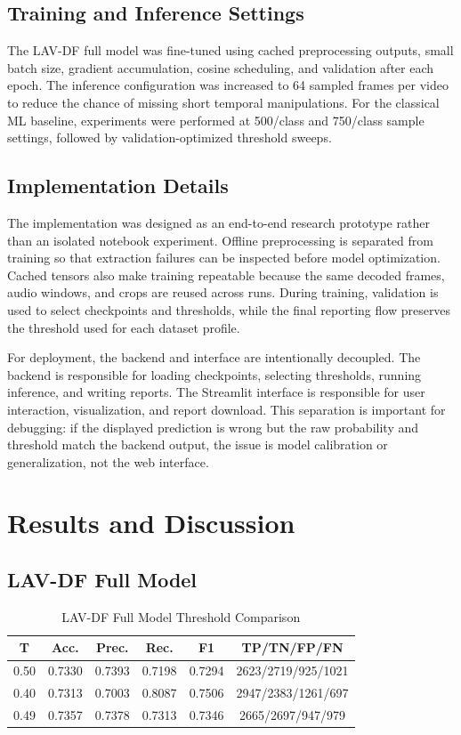 \documentclass[conference]{IEEEtran}
\begin{document}
\subsection{Training and Inference Settings}
The LAV-DF full model was fine-tuned using cached preprocessing outputs, small batch size, gradient accumulation, cosine scheduling, and validation after each epoch. The inference configuration was increased to 64 sampled frames per video to reduce the chance of missing short temporal manipulations. For the classical ML baseline, experiments were performed at 500/class and 750/class sample settings, followed by validation-optimized threshold sweeps.

\subsection{Implementation Details}
The implementation was designed as an end-to-end research prototype rather than an isolated notebook experiment. Offline preprocessing is separated from training so that extraction failures can be inspected before model optimization. Cached tensors also make training repeatable because the same decoded frames, audio windows, and crops are reused across runs. During training, validation is used to select checkpoints and thresholds, while the final reporting flow preserves the threshold used for each dataset profile.

For deployment, the backend and interface are intentionally decoupled. The backend is responsible for loading checkpoints, selecting thresholds, running inference, and writing reports. The Streamlit interface is responsible for user interaction, visualization, and report download. This separation is important for debugging: if the displayed prediction is wrong but the raw probability and threshold match the backend output, the issue is model calibration or generalization, not the web interface.

\section{Results and Discussion}
\subsection{LAV-DF Full Model}
\begin{table}[htbp]
\caption{LAV-DF Full Model Threshold Comparison}
\centering
\begin{tabular}{cccccc}
\toprule
T & Acc. & Prec. & Rec. & F1 & TP/TN/FP/FN \\
\midrule
0.50 & 0.7330 & 0.7393 & 0.7198 & 0.7294 & 2623/2719/925/1021 \\
0.40 & 0.7313 & 0.7003 & 0.8087 & 0.7506 & 2947/2383/1261/697 \\
0.49 & 0.7357 & 0.7378 & 0.7313 & 0.7346 & 2665/2697/947/979 \\
\bottomrule
\end{tabular}
\end{table}
\end{document}
